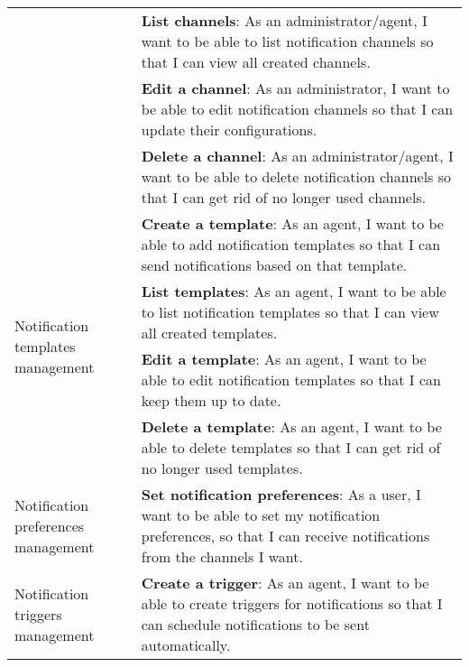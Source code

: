 \begin{longtable}{ | m{}  | m{} | }
      \cline{2-2}
                                                              & \textbf{List channels}: As an administrator/agent, I want to be able to list notification channels so that I can view all created channels.                                                  \\
      \cline{2-2}
                                                              & \textbf{Edit a channel}: As an administrator, I want to be able to edit notification channels so that I can update their configurations.                                                     \\
      \cline{2-2}
                                                              & \textbf{Delete a channel}: As an administrator/agent, I want to be able to delete notification channels so that I can get rid of no longer used channels.                                    \\
      \hline
      \multirow[t]{4}{5em}{Notification templates management} & \textbf{Create a template}: As an agent, I want to be able to add notification templates so that I can send notifications based on that template.                                            \\
      \cline{2-2}
                                                              & \textbf{List templates}: As an agent, I want to be able to list notification templates so that I can view all created templates.                                                             \\
      \cline{2-2}
                                                              & \textbf{Edit a template}: As an agent, I want to be able to edit notification templates so that I can keep them up to date.                                                                  \\
      \cline{2-2}
                                                              & \textbf{Delete a template}: As an agent, I want to be able to delete templates so that I can get rid of no longer used templates.                                                            \\
      \hline
      Notification preferences management                     & \textbf{Set notification preferences}: As a user, I want to be able to set my notification preferences, so that I can receive notifications from the channels I want.                        \\
      \hline
      \multirow[t]{4}{5em}{Notification triggers management}  & \textbf{Create a trigger}: As an agent, I want to be able to create triggers for notifications so that I can schedule notifications to be sent automatically.                                \\

\end{longtable}
